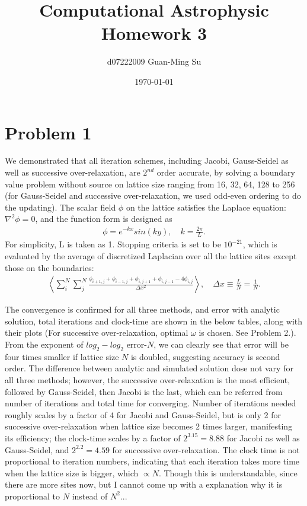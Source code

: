 \documentclass[a4paper,10pt]{article}
\title{Computational Astrophysic\\Homework 3}
\author{d07222009 Guan-Ming Su}
\date{\today}       %
\begin{document}
\maketitle

\section*{Problem 1}
 \begin{large}
We demonstrated that all iteration schemes, including Jacobi, Gauss-Seidel as well as successive over-relaxation, are $2^{nd}$ order accurate, by solving a  boundary value problem without source on lattice size ranging from 16, 32, 64, 128 to 256 (for Gauss-Seidel and successive over-relaxation, we used odd-even ordering to do the updating).  The scalar field $\phi$ on the lattice satisfies the Laplace equation: $\nabla^{2}\phi=0$, and the function form is designed as 
\begin{align*}
\phi=e^{-kx}sin(ky),\quad k=\frac{2\pi}{L}.
\end{align*}
For simplicity, L is taken as 1. Stopping criteria is set to be $10^{-21}$, which is evaluated by the average of discretized Laplacian over all the lattice sites except those on the boundaries:
\begin{align*}
\left <\sum_{i}^N\sum_{j}^N\frac{\phi_{i+1,j}+\phi_{i-1,j}+\phi_{i,j+1}+\phi_{i,j-1}-4\phi_{i,j}}{\Delta x^2}\right >,\quad \Delta x \equiv \frac{L}{N}=\frac{1}{N}.
\end{align*}

The convergence is confirmed for all three methods, and error with analytic solution, total iterations and clock-time are shown in the below tables, along with their plots (For successive over-relaxation, optimal $\omega$ is chosen. See Problem 2.). From the exponent of $log_2-log_2$ error-$N$, we can clearly see that error will be four times smaller if lattice size $N$ is doubled, suggesting accuracy is second order. The difference between analytic and simulated solution dose not vary for all three methods; however, the successive over-relaxation is the most efficient, followed by Gauss-Seidel, then Jacobi is the last, which can be referred from number of iterations and total time for converging. Number of iterations needed roughly scales by a factor of 4  for Jacobi and Gauss-Seidel, but is only 2 for successive over-relaxation when lattice size becomes 2 times larger, manifesting its efficiency; the clock-time scales by a factor of $2^{3.15} = 8.88$ for Jacobi as well as Gauss-Seidel, and $2^{2.2} = 4.59$  for successive over-relaxation. The clock time is not proportional to iteration numbers, indicating that each iteration takes more time when the lattice size is bigger, which $\propto N$. Though this is understandable, since there are more sites now, but I cannot come up with a explanation why it is proportional to $N$ instead of $N^2$... 


\end{large}
\end{document}
